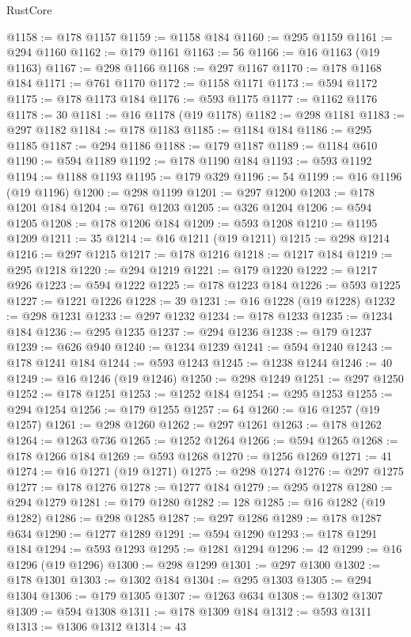 \begin{lexlean}{RustCore}
\begin{coremodule}
@1158 := @178 @1157
@1159 := @1158 @184
@1160 := @295 @1159
@1161 := @294 @1160
@1162 := @179 @1161
@1163 := 56
@1166 := @16 @1163 (@19 @1163)
@1167 := @298 @1166
@1168 := @297 @1167
@1170 := @178 @1168 @184
@1171 := @761 @1170
@1172 := @1158 @1171
@1173 := @594 @1172
@1175 := @178 @1173 @184
@1176 := @593 @1175
@1177 := @1162 @1176
@1178 := 30
@1181 := @16 @1178 (@19 @1178)
@1182 := @298 @1181
@1183 := @297 @1182
@1184 := @178 @1183
@1185 := @1184 @184
@1186 := @295 @1185
@1187 := @294 @1186
@1188 := @179 @1187
@1189 := @1184 @610
@1190 := @594 @1189
@1192 := @178 @1190 @184
@1193 := @593 @1192
@1194 := @1188 @1193
@1195 := @179 @329
@1196 := 54
@1199 := @16 @1196 (@19 @1196)
@1200 := @298 @1199
@1201 := @297 @1200
@1203 := @178 @1201 @184
@1204 := @761 @1203
@1205 := @326 @1204
@1206 := @594 @1205
@1208 := @178 @1206 @184
@1209 := @593 @1208
@1210 := @1195 @1209
@1211 := 35
@1214 := @16 @1211 (@19 @1211)
@1215 := @298 @1214
@1216 := @297 @1215
@1217 := @178 @1216
@1218 := @1217 @184
@1219 := @295 @1218
@1220 := @294 @1219
@1221 := @179 @1220
@1222 := @1217 @926
@1223 := @594 @1222
@1225 := @178 @1223 @184
@1226 := @593 @1225
@1227 := @1221 @1226
@1228 := 39
@1231 := @16 @1228 (@19 @1228)
@1232 := @298 @1231
@1233 := @297 @1232
@1234 := @178 @1233
@1235 := @1234 @184
@1236 := @295 @1235
@1237 := @294 @1236
@1238 := @179 @1237
@1239 := @626 @940
@1240 := @1234 @1239
@1241 := @594 @1240
@1243 := @178 @1241 @184
@1244 := @593 @1243
@1245 := @1238 @1244
@1246 := 40
@1249 := @16 @1246 (@19 @1246)
@1250 := @298 @1249
@1251 := @297 @1250
@1252 := @178 @1251
@1253 := @1252 @184
@1254 := @295 @1253
@1255 := @294 @1254
@1256 := @179 @1255
@1257 := 64
@1260 := @16 @1257 (@19 @1257)
@1261 := @298 @1260
@1262 := @297 @1261
@1263 := @178 @1262
@1264 := @1263 @736
@1265 := @1252 @1264
@1266 := @594 @1265
@1268 := @178 @1266 @184
@1269 := @593 @1268
@1270 := @1256 @1269
@1271 := 41
@1274 := @16 @1271 (@19 @1271)
@1275 := @298 @1274
@1276 := @297 @1275
@1277 := @178 @1276
@1278 := @1277 @184
@1279 := @295 @1278
@1280 := @294 @1279
@1281 := @179 @1280
@1282 := 128
@1285 := @16 @1282 (@19 @1282)
@1286 := @298 @1285
@1287 := @297 @1286
@1289 := @178 @1287 @634
@1290 := @1277 @1289
@1291 := @594 @1290
@1293 := @178 @1291 @184
@1294 := @593 @1293
@1295 := @1281 @1294
@1296 := 42
@1299 := @16 @1296 (@19 @1296)
@1300 := @298 @1299
@1301 := @297 @1300
@1302 := @178 @1301
@1303 := @1302 @184
@1304 := @295 @1303
@1305 := @294 @1304
@1306 := @179 @1305
@1307 := @1263 @634
@1308 := @1302 @1307
@1309 := @594 @1308
@1311 := @178 @1309 @184
@1312 := @593 @1311
@1313 := @1306 @1312
@1314 := 43

\end{coremodule}
\end{lexlean}
